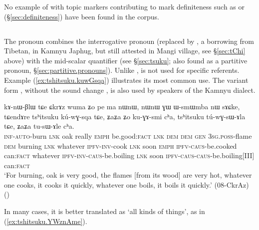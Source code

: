 No example of  with topic markers contributing to mark definiteness such as  or  (§\ref{sec:definiteness}) have been found in the corpus.

\subsection{} \label{sec:tshitsuku}
The pronoun  combines the  interrogative pronoun  (replaced by , a borrowing from Tibetan, in Kamnyu Japhug, but still attested in Mangi village, see §\ref{sec:tChi} above) with the mid-scalar quantifier   (see §\ref{sec:tsuku}; also found as a partitive pronoun, §\ref{sec:partitive.pronouns}).  Unlike  , is not used for specific referents.  Example (\ref{ex:tshitsuku.kuwGsqa}) illustrates its most common use. The variant form , without the sound change  \fl{} , is also used by speakers of the Kamnyu dialect.

\begin{exe}
\ex \label{ex:tshitsuku.kuwGsqa}
\gll kɤ-nɯ-βlɯ tɕe ɕkrɤz wuma ʑo pe ma nɯnɯ, nɯnɯ ɣɯ ɯ-smɯmba nɯ sɤɕke, tɕendɤre tsʰitsuku kú-wɣ-sqa tɕe, ʑaʑa ʑo ku-ɣɤ-smi cʰa, tsʰitsuku tú-wɣ-sɯ-ɤla tɕe, ʑaʑa tu-sɯ-ɤle cʰa. \\
\textsc{inf}-\textsc{auto}-burn \textsc{lnk} oak really \textsc{emph} be.good:\textsc{fact} \textsc{lnk} \textsc{dem} \textsc{dem} \textsc{gen} \textsc{3sg}.\textsc{poss}-flame \textsc{dem} burning \textsc{lnk} whatever \textsc{ipfv}-\textsc{inv}-cook \textsc{lnk} soon \textsc{emph}  \textsc{ipfv}-\textsc{caus}-be.cooked can:\textsc{fact} whatever \textsc{ipfv}-\textsc{inv}-\textsc{caus}-be.boiling \textsc{lnk} soon  \textsc{ipfv}-\textsc{caus}-\textsc{caus}-be.boiling[III] can:\textsc{fact} \\
\glt `For burning, oak is very good, the flames [from its wood] are very hot, whatever one cooks, it cooks it quickly, whatever one boils, it boils it quickly.' (08-CkrAz) ()
\end{exe}
 
In many cases, it is better translated as `all kinds of things', as in (\ref{ex:tshitsuku.YWznAme}).

